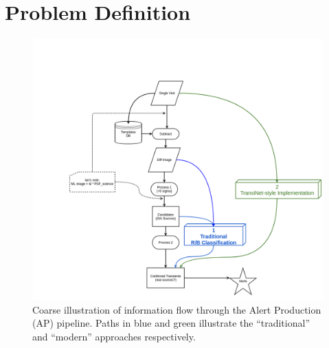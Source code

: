 \section{Problem Definition}
\begin{figure}
  \centering
  \includegraphics[width=1\textwidth]{material/diagram}
  \caption{Coarse illustration of information flow through the Alert Production (AP) pipeline. Paths in blue and green illustrate the ``traditional'' and ``modern'' approaches respectively.}
\end{figure}






